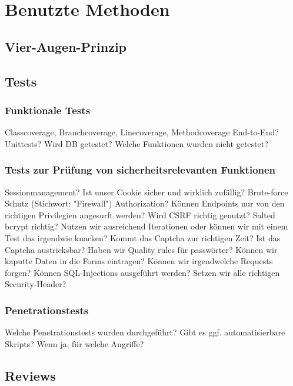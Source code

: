 \documentclass[12pt,DIV14,BCOR10mm,a4paper,twoside,parskip=half-,headsepline,headinclude,english,ngerman,bibliography=totocnumbered]{scrreprt}
\begin{document}
\tableofcontents  %

\chapter{Benutzte Methoden}
\section{Vier-Augen-Prinzip}
\section{Tests}

\subsection{Funktionale Tests}

Classcoverage, Branchcoverage, Linecoverage, Methodcoverage
End-to-End? Unittests? Wird DB getestet?
Welche Funktionen wurden nicht getestet?

\subsection{Tests zur Prüfung von sicherheitsrelevanten Funktionen}

Sessionmanagement?
Ist unser Cookie sicher und wirklich zufällig?
Brute-force Schutz (Stichwort: "Firewall")
Authorization? Können Endpoints nur von den richtigen Privilegien angesurft werden?
Wird CSRF richtig genutzt?
Salted bcrypt richtig? Nutzen wir ausreichend Iterationen oder können wir mit einem Test das irgendwie knacken?
Kommt das Captcha zur richtigen Zeit? Ist das Captcha austricksbar?
Haben wir Quality rules für passwörter?
Können wir kaputte Daten in die Forms eintragen?
Können wir irgendwelche Requests forgen?
Können SQL-Injections ausgeführt werden?
Setzen wir alle richtigen Security-Header?

\subsection{Penetrationstests}

Welche Penetrationstests wurden durchgeführt?
Gibt es ggf. automatisierbare Skripts?
Wenn ja, für welche Angriffe?

\section{Reviews}
\end{document}
